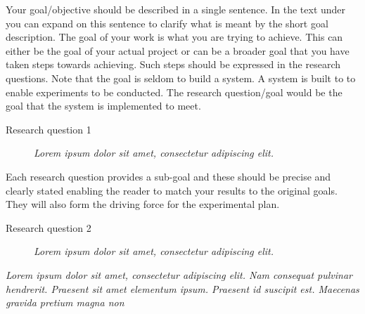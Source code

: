     Your goal/objective should be described in a single sentence. In the text under you can expand on this sentence to clarify what is meant by the short goal description.
    The goal of your work is what you are trying to achieve. This can either be the goal of your actual project or can be a broader goal that you have taken steps towards achieving. Such steps should be expressed in the research questions.
    Note that the goal is seldom to build a system. A system is built to to enable experiments to be conducted. The research question/goal would be the goal that the system is implemented to meet.


    \begin{description}
        \item[Research question 1] {\it Lorem ipsum dolor sit amet, consectetur adipiscing elit.}
    \end{description}

    Each research question provides a sub-goal and these should be precise and clearly stated enabling the reader to match your results to the original goals. They will also form the driving force for the experimental plan.

    \begin{description}
        \item[Research question 2] {\it Lorem ipsum dolor sit amet, consectetur adipiscing elit.}
    \end{description}

    {\it Lorem ipsum dolor sit amet, consectetur adipiscing elit. Nam consequat pulvinar hendrerit. Praesent sit amet elementum ipsum. Praesent id suscipit est. Maecenas gravida pretium magna non }
\fi
